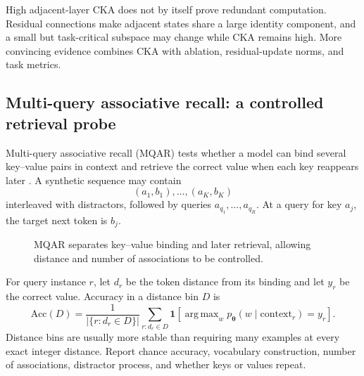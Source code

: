 \documentclass[11pt,a4paper]{article}
\theoremstyle{definition}
\theoremstyle{plain}
\newcommand{\vtheta}{\bm{\theta}}
\newcommand{\ind}{\mathbf{1}}
\DeclareMathOperator{\argmax}{arg\,max}
\begin{document}
High adjacent-layer CKA does not by itself prove redundant computation. Residual connections make adjacent states share a large identity component, and a small but task-critical subspace may change while CKA remains high. More convincing evidence combines CKA with ablation, residual-update norms, and task metrics.

\subsection{Multi-query associative recall: a controlled retrieval probe}
\label{sec:mqar}

Multi-query associative recall (MQAR) tests whether a model can bind several key--value pairs in context and retrieve the correct value when each key reappears later \cite{arora2024zoology}. A synthetic sequence may contain
\begin{equation}
    (a_1,b_1),\ldots,(a_K,b_K)
\end{equation}
interleaved with distractors, followed by queries $a_{q_1},\ldots,a_{q_R}$. At a query for key $a_j$, the target next token is $b_j$.

\begin{figure}[H]
\centering
{}
\caption{MQAR separates key--value binding and later retrieval, allowing distance and number of associations to be controlled.}
\label{fig:mqar}
\end{figure}

For query instance $r$, let $d_r$ be the token distance from its binding and let $y_r$ be the correct value. Accuracy in a distance bin $D$ is
\begin{equation}
    \mathrm{Acc}(D)
    =\frac{1}{|\{r:d_r\in D\}|}
      \sum_{r:d_r\in D}
      \ind\!\left[
        \argmax_{w} p_{\vtheta}(w\mid\text{context}_r)=y_r
      \right].
\end{equation}
Distance bins are usually more stable than requiring many examples at every exact integer distance. Report chance accuracy, vocabulary construction, number of associations, distractor process, and whether keys or values repeat.
\end{document}
